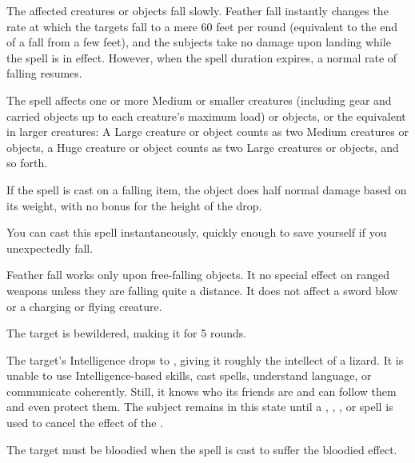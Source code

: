 \spellrng{\rngmed}
\begin{spelleffect}
  The affected creatures or objects fall slowly. Feather fall instantly changes the rate at which the targets fall to a mere 60 feet per round (equivalent to the end of a fall from a few feet), and the subjects take no damage upon landing while the spell is in effect. However, when the spell duration expires, a normal rate of falling resumes.
  \par The spell affects one or more Medium or smaller creatures (including gear and carried objects up to each creature's maximum load) or objects, or the equivalent in larger creatures: A Large creature or object counts as two Medium creatures or objects, a Huge creature or object counts as two Large creatures or objects, and so forth.
  \par If the spell is cast on a falling item, the object does half normal damage based on its weight, with no bonus for the height of the drop.
\end{spelleffect}
\begin{spellnotes}
  You can cast this spell instantaneously, quickly enough to save yourself if you unexpectedly fall. 
  \par Feather fall works only upon free-falling objects. It no special effect on ranged weapons unless they are falling quite a distance. It does not affect a sword blow or a charging or flying creature.
\end{spellnotes}

\spellrng{\rngtouch}
\begin{spellhealthy}
  The target is bewildered, making it \vulnerable for 5 rounds.
\end{spellhealthy}
\begin{spellblood}
  The target's Intelligence drops to , giving it roughly the intellect of a lizard. It is unable to use Intelligence-based skills, cast spells, understand language, or communicate coherently. Still, it knows who its friends are and can follow them and even protect them. The subject remains in this state until a , , , or  spell is used to cancel the effect of the .
\end{spellblood}
\begin{spellnotes}
  The target must be bloodied when the spell is cast to suffer the bloodied effect.
\end{spellnotes}

